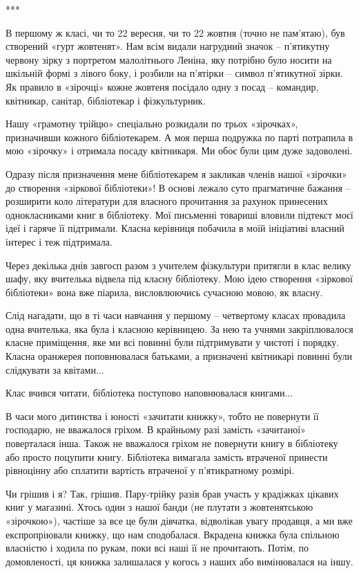 ***

В першому ж класі, чи то 22 вересня, чи то 22 жовтня (точно не пам’ятаю), був
створений «гурт жовтенят». Нам всім видали нагрудний значок – п’ятикутну
червону зірку з портретом малолітнього Леніна, яку потрібно було носити на
шкільній формі з лівого боку, і розбили на п’ятірки – символ п’ятикутної зірки.
Як правило в «зірочці» кожне жовтеня посідало одну з посад – командир,
квітникар, санітар, бібліотекар і фізкультурник. 

Нашу «грамотну трійцю» спеціально розкидали по трьох «зірочках», призначивши
кожного бібліотекарем. А моя перша подружка по парті потрапила в мою «зірочку»
і отримала посаду квітникаря. Ми обоє були цим дуже задоволені.  

Одразу після призначення мене бібліотекарем я закликав членів нашої «зірочки»
до створення «зіркової бібліотеки»! В основі лежало суто прагматичне бажання –
розширити коло літератури для власного прочитання за рахунок принесених
однокласниками книг в бібліотеку. Мої письменні товариші вловили підтекст моєї
ідеї і гаряче її підтримали. Класна керівниця побачила в моїй ініціативі
власний інтерес і теж підтримала. 

Через декілька днів завгосп разом з учителем фізкультури притягли в клас велику
шафу, яку вчителька відвела під класну бібліотеку. Мою ідею створення «зіркової
бібліотеки» вона вже піарила, висловлюючись сучасною мовою, як власну.

Слід нагадати, що в ті часи навчання у першому – четвертому класах провадила
одна вчителька, яка була і класною керівницею. За нею та учнями закріплювалося
класне приміщення, яке ми всі повинні були підтримувати у чистоті і порядку.
Класна оранжерея поповнювалася батьками, а призначені квітникарі повинні були
слідкувати за квітами... 

Клас вчився читати, бібліотека поступово наповнювалася книгами...

В часи мого дитинства і юності «зачитати книжку», тобто не повернути її
господарю, не вважалося гріхом. В крайньому разі замість «зачитаної»
поверталася інша. Також не вважалося гріхом не повернути книгу в бібліотеку або
просто поцупити книгу. Бібліотека вимагала замість втраченої принести
рівноцінну або сплатити вартість втраченої у п’ятикратному розмірі. 

Чи грішив і я? Так, грішив. Пару-трійку разів брав участь у крадіжках цікавих
книг у магазині. Хтось один з нашої банди (не плутати з жовтенятською
«зірочкою»), частіше за все це були дівчатка, відволікав увагу продавця, а ми
вже експропріювали книжку, що нам сподобалася. Вкрадена книжка була спільною
власністю і ходила по рукам, поки всі наші її не прочитають. Потім, по
домовленості, ця книжка залишалася у когось з наших або вимінювалася на іншу.

